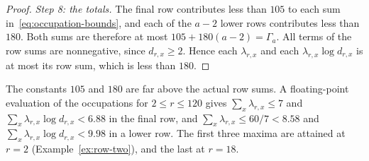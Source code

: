 \begin{proof}
\emph{Step 8: the totals.} The final row contributes less than \(105\) to
each sum in~\eqref{eq:occupation-bounds}, and each of the \(a-2\) lower
rows contributes less than \(180\). Both sums are therefore at most
\(105+180(a-2)=\Gamma_a\). All terms of the row sums are nonnegative,
since \(d_{r,x}\ge2\). Hence each \(\lambda_{r,x}\) and each
\(\lambda_{r,x}\log d_{r,x}\) is at most its row sum, which is less than
\(180\).
\end{proof}

\begin{remark}\label{rem:occupation-constants}
The constants \(105\) and \(180\) are far above the actual row sums. A
floating-point evaluation of the occupations for \(2\le r\le120\) gives
\(\sum_x\lambda_{r,x}\le7\) and \(\sum_x\lambda_{r,x}\log d_{r,x}<6.88\)
in the final row, and \(\sum_x\lambda_{r,x}\le60/7<8.58\) and
\(\sum_x\lambda_{r,x}\log d_{r,x}<9.98\) in a lower row. The first three
maxima are attained at \(r=2\) (Example~\ref{ex:row-two}), and the last
at \(r=18\).
\end{remark}
